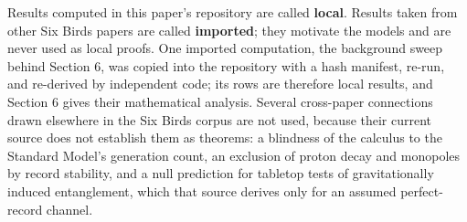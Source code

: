 Results computed in this paper's repository are called \textbf{local}.
Results taken from other Six Birds papers are called \textbf{imported};
they motivate the models and are never used as local proofs. One
imported computation, the background sweep behind Section 6, was copied
into the repository with a hash manifest, re-run, and re-derived by
independent code; its rows are therefore local results, and Section 6
gives their mathematical analysis. Several cross-paper connections drawn
elsewhere in the Six Birds corpus are not used, because their current
source does not establish them as theorems: a blindness of the calculus
to the Standard Model's generation count, an exclusion of proton decay
and monopoles by record stability, and a null prediction for tabletop
tests of gravitationally induced entanglement, which that source derives
only for an assumed perfect-record channel.
